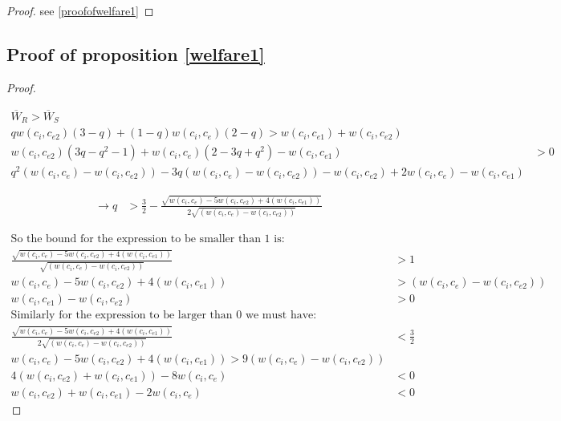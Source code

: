 \documentclass[11pt]{article}
\begin{document}
\begin{proof}
see \ref{proofofwelfare1}
\end{proof}

\subsection{Proof of proposition \ref{welfare1}}

\begin{proof}\label{proofofwelfare1}

\begin{align*}
\overline{W}_R>\overline{W}_S& \\
 q w(c_{i}, c_{e2})(3-q ) 
+(1-q)w(c_{i}, c_{e})(2-q)  
>
w(c_{i}, c_{e1})
+
w(c_{i}, c_{e2})&  \\
w(c_{i}, c_{e2})(3q-q^2-1 ) 
+w(c_{i}, c_{e})(2-3q+q^2) -w(c_{i}, c_{e1}) 
&>
0
\\
q^2(w(c_{i}, c_{e})-w(c_{i}, c_{e2}))
-3q(w(c_{i}, c_{e})-w(c_{i}, c_{e2}))
-w(c_{i}, c_{e2}) 
+2 w(c_{i}, c_{e}) -w(c_{i}, c_{e1})
\end{align*}

\begin{align*}
\rightarrow q &> \frac{3}{2} - \frac{  \sqrt{ w(c_{i}, c_{e})-5w(c_{i}, c_{e2})+4(w(c_{i}, c_{e1}))}}{2\sqrt{(w(c_{i}, c_{e})-w(c_{i}, c_{e2}))}}
\end{align*}

\begin{align*}
\text{So the bound for the expression to be smaller than 1 is:} \\
\frac{  \sqrt{ w(c_{i}, c_{e})-5w(c_{i}, c_{e2})+4(w(c_{i}, c_{e1}))}}{\sqrt{(w(c_{i}, c_{e})-w(c_{i}, c_{e2}))}}  &> 1 \\
 w(c_{i}, c_{e})-5w(c_{i}, c_{e2})+4(w(c_{i}, c_{e1})) & > (w(c_{i}, c_{e})-w(c_{i}, c_{e2})) \\
w(c_{i}, c_{e1})-w(c_{i}, c_{e2})  &> 0 \\
\text{Similarly for the expression to be larger than 0 we must have:} \\
\frac{  \sqrt{ w(c_{i}, c_{e})-5w(c_{i}, c_{e2})+4(w(c_{i}, c_{e1}))}}{2\sqrt{(w(c_{i}, c_{e})-w(c_{i}, c_{e2}))}} &< \frac{3}{2} \\
 w(c_{i}, c_{e})-5w(c_{i}, c_{e2})+4(w(c_{i}, c_{e1})) > 9(w(c_{i}, c_{e})-w(c_{i}, c_{e2})) \\
 4(w(c_{i}, c_{e2})+w(c_{i}, c_{e1}))-8 w(c_{i}, c_{e}) &< 0 \\
 w(c_{i}, c_{e2})+w(c_{i}, c_{e1})-2 w(c_{i}, c_{e}) &< 0
\end{align*}
\end{proof}


\newpage



\end{document}
